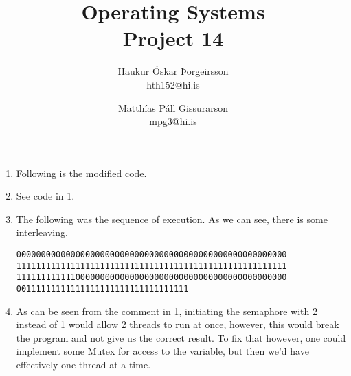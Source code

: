 \documentclass[a4]{article}
\title{Operating Systems\\
Project 14}
\author{
    Haukur Óskar Þorgeirsson\\
    hth152@hi.is \and
    Matthías Páll Gissurarson\\
    mpg3@hi.is
}
\begin{document}
\maketitle


\begin{enumerate}
\item Following is the modified code.  
\item See code in 1.
\item The following was the sequence of execution. As we can see,
  there is some interleaving.
\begin{verbatim}
0000000000000000000000000000000000000000000000000000000
1111111111111111111111111111111111111111111111111111111
1111111111110000000000000000000000000000000000000000000
00111111111111111111111111111111111
\end{verbatim}
\item As can be seen from the comment in 1, initiating the semaphore
  with 2 instead of 1 would allow 2 threads to run at once, however,
  this would break the program and not give us the correct result. To
  fix that however, one could implement some Mutex for access to the
  variable, but then we'd have effectively one thread at a time.
\end{enumerate}
\end{document}
